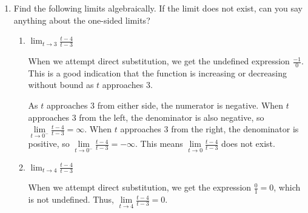 \documentclass{article}
\begin{document}
\begin{enumerate}[resume]
\begin{enumerate}
    \item      
      \begin{problem}
        $\displaystyle \lim_{x \to 2} \frac{x - 5}{2 - x}$
      \end{problem}

      \begin{solution}
        When $x$ approaches $2$, the function increases without bound on one side and decreases without
        bound on the other, so $\lim\limits_{x \to 2} \frac{x-5}{2-x}$ does not exist.
      \end{solution}

    \end{enumerate}
  \probonly{\end{multicols}}


\item 
  Find the following limits algebraically. If the limit does not exist, can you say anything about the one-sided limits?

  \begin{enumerate}
  \item
    \begin{problem}[\vfill]
      $\displaystyle \lim_{t \to 3} \frac{t - 4}{t - 3}$
    \end{problem}

    \begin{solution}
      When we attempt direct substitution, we get the undefined expression $\frac{-1}{0}$. This is a good
      indication that the function is increasing or decreasing without bound as $t$ approaches $3$.
      
      
      As $t$ approaches $3$ from either side, the numerator is negative.
      When $t$ approaches $3$ from the left, the denominator is also negative, so 
      $\lim\limits_{t \to 0^-} \frac{t-4}{t-3} = \infty$. When $t$ approaches $3$ from the right, the denominator
      is positive, so $\lim\limits_{t \to 0^-} \frac{t-4}{t-3} = -\infty$. 
      This means $\lim\limits_{t \to 0} \frac{t-4}{t-3}$ does not exist.
    \end{solution}

  \item
    \begin{problem}[\vfill]
      $\displaystyle \lim_{t \to 4} \frac{t - 4}{t - 3}$
    \end{problem}

    \begin{solution}
      When we attempt direct substitution, we get the expression $\frac{0}{1}=0$, which is not undefined.
      Thus, $\lim\limits_{t \to 4} \frac{t-4}{t-3}=0$. 
    \end{solution}


\end{enumerate}
\end{enumerate}
\end{document}
